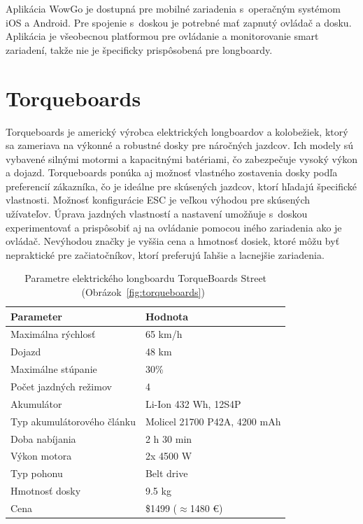 Aplikácia WowGo je dostupná pre mobilné zariadenia s~operačným systémom iOS a Android.
Pre spojenie s~doskou je potrebné mať zapnutý ovládač a dosku.
Aplikácia je všeobecnou platformou pre ovládanie a monitorovanie smart zariadení, takže nie je špecificky prispôsobená pre longboardy.\cite{WowGo}

\section{Torqueboards}
Torqueboards je americký výrobca elektrických longboardov a kolobežiek, ktorý sa zameriava na výkonné a robustné dosky pre náročných jazdcov.
Ich modely sú vybavené silnými motormi a kapacitnými batériami, čo zabezpečuje vysoký výkon a dojazd.
Torqueboards ponúka aj možnosť vlastného zostavenia dosky podľa preferencií zákazníka, čo je ideálne pre skúsených jazdcov, ktorí hľadajú špecifické vlastnosti.
Možnosť konfigurácie ESC je veľkou výhodou pre skúsených užívateľov.
Úprava jazdných vlastností a nastavení umožňuje s~doskou experimentovať a prispôsobiť aj na ovládanie pomocou iného zariadenia ako je ovládač. 
Nevýhodou značky je vyššia cena a hmotnosť dosiek, ktoré môžu byť nepraktické pre začiatočníkov, ktorí preferujú ľahšie a lacnejšie zariadenia.\cite{TorqueBoards}

\begin{table}[h]
    \centering
    \begin{tabular}{|l|l|}
        \hline
        \textbf{Parameter} & \textbf{Hodnota} \\ \hline
        Maximálna rýchlosť & 65 km/h \\ \hline
        Dojazd & 48 km \\ \hline
        Maximálne stúpanie & 30\% \\ \hline
        Počet jazdných režimov & 4 \\ \hline
        Akumulátor & Li-Ion 432 Wh, 12S4P \\ \hline
        Typ akumulátorového článku & Molicel 21700 P42A, 4200 mAh \\ \hline
        Doba nabíjania & 2 h 30 min \\ \hline
        Výkon motora & 2x 4500 W \\ \hline
        Typ pohonu & Belt drive \\ \hline
        Hmotnosť dosky & 9.5 kg \\ \hline
        Cena & \$1499 ($\approx$1480 €) \\ \hline
    \end{tabular}
    \caption{Parametre elektrického longboardu TorqueBoards Street (Obrázok~\ref{fig:torqueboards})~\cite{TorqueBoards}}\label{tab:torqueboards}
\end{table}

